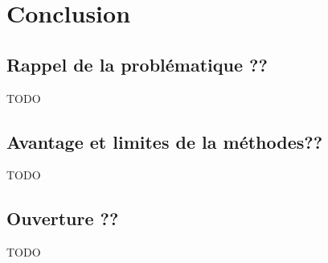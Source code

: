 \chapter{Conclusion}
    \label{chapter:5-CONCLUSION}

    \section{Rappel de la problématique ??}

    TODO

    \section{Avantage et limites de la méthodes??}

    TODO

    \section{Ouverture ??}

    TODO